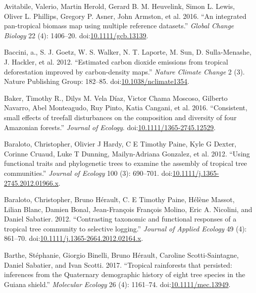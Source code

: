 \documentclass[]{elsarticle} %
\begin{document}
\hypertarget{ref-Avitabile2016}{}
Avitabile, Valerio, Martin Herold, Gerard B. M. Heuvelink, Simon L.
Lewis, Oliver L. Phillips, Gregory P. Asner, John Armston, et al. 2016.
``An integrated pan-tropical biomass map using multiple reference
datasets.'' \emph{Global Change Biology} 22 (4): 1406--20.
doi:\href{https://doi.org/10.1111/gcb.13139}{10.1111/gcb.13139}.

\hypertarget{ref-Baccini2012a}{}
Baccini, a., S. J. Goetz, W. S. Walker, N. T. Laporte, M. Sun, D.
Sulla-Menashe, J. Hackler, et al. 2012. ``Estimated carbon dioxide
emissions from tropical deforestation improved by carbon-density maps.''
\emph{Nature Climate Change} 2 (3). Nature Publishing Group: 182--85.
doi:\href{https://doi.org/10.1038/nclimate1354}{10.1038/nclimate1354}.

\hypertarget{ref-Baker2016}{}
Baker, Timothy R., Dilys M. Vela Díaz, Victor Chama Moscoso, Gilberto
Navarro, Abel Monteagudo, Ruy Pinto, Katia Cangani, et al. 2016.
``Consistent, small effects of treefall disturbances on the composition
and diversity of four Amazonian forests.'' \emph{Journal of Ecology}.
doi:\href{https://doi.org/10.1111/1365-2745.12529}{10.1111/1365-2745.12529}.

\hypertarget{ref-Baraloto2012a}{}
Baraloto, Christopher, Olivier J Hardy, C E Timothy Paine, Kyle G
Dexter, Corinne Cruaud, Luke T Dunning, Mailyn-Adriana Gonzalez, et al.
2012. ``Using functional traits and phylogenetic trees to examine the
assembly of tropical tree communities.'' \emph{Journal of Ecology} 100
(3): 690--701.
doi:\href{https://doi.org/10.1111/j.1365-2745.2012.01966.x}{10.1111/j.1365-2745.2012.01966.x}.

\hypertarget{ref-Baraloto2012}{}
Baraloto, Christopher, Bruno Hérault, C. E Timothy Paine, Hélène Massot,
Lilian Blanc, Damien Bonal, Jean-François François Molino, Eric A.
Nicolini, and Daniel Sabatier. 2012. ``Contrasting taxonomic and
functional responses of a tropical tree community to selective
logging.'' \emph{Journal of Applied Ecology} 49 (4): 861--70.
doi:\href{https://doi.org/10.1111/j.1365-2664.2012.02164.x}{10.1111/j.1365-2664.2012.02164.x}.

\hypertarget{ref-Barthe2017}{}
Barthe, Stéphanie, Giorgio Binelli, Bruno Hérault, Caroline
Scotti-Saintagne, Daniel Sabatier, and Ivan Scotti. 2017. ``Tropical
rainforests that persisted: inferences from the Quaternary demographic
history of eight tree species in the Guiana shield.'' \emph{Molecular
Ecology} 26 (4): 1161--74.
doi:\href{https://doi.org/10.1111/mec.13949}{10.1111/mec.13949}.
\end{document}
